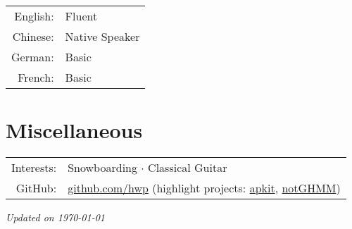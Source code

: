 \documentclass[a4paper,9pt]{article} %
\begin{document}
\begin{tabular}{rl}
  English: & Fluent \\
  Chinese: & Native Speaker \\
  German: & Basic \\
  French: & Basic \\
\end{tabular}

\section{Miscellaneous}

\begin{tabular}{rl}
  Interests: & Snowboarding $\cdotp$ Classical Guitar \\
  GitHub: & \href{https://github.com/hwp}{github.com/hwp} (highlight projects: \href{https://github.com/hwp/apkit}{apkit}, \href{https://github.com/hwp/notGHMM}{notGHMM}) \\
\end{tabular}



\vfill
\centering \footnotesize \itshape{Updated on \today}
\end{document}
